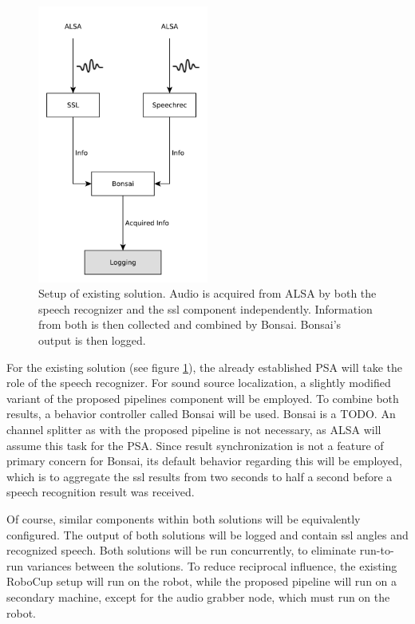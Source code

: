 \begin{figure}[]
	\centering
	\includegraphics[width=0.5\textwidth]{diagrams/eval_task_old.pdf}
	\caption{Setup of existing solution. 
		Audio is acquired from ALSA by both the speech recognizer and the \gls{ssl} component independently. 
		Information from both is then collected and combined by Bonsai.
		Bonsai's output is then logged.}
	\label{pic:eval_task_setup_old}
\end{figure}

For the existing solution (see figure \ref{pic:eval_task_setup_old}), the already established PSA will take the role of the speech recognizer.
For sound source localization, a slightly modified variant of the proposed pipelines component will be employed.
To combine both results, a behavior controller called Bonsai \cite{bonsai} will be used.
Bonsai is a TODO.
An channel splitter as with the proposed pipeline is not necessary, as ALSA will assume this task for the PSA.
Since result synchronization is not a feature of primary concern for Bonsai, its default behavior regarding this will be employed, which is to aggregate the \gls{ssl} results from two seconds to half a second before a speech recognition result was received.

Of course, similar components within both solutions will be equivalently configured.
The output of both solutions will be logged and contain \gls{ssl} angles and recognized speech.
Both solutions will be run concurrently, to eliminate run-to-run variances between the solutions.
To reduce reciprocal influence, the existing RoboCup setup will run on the robot, while the proposed pipeline will run on a secondary machine, except for the audio grabber node, which must run on the robot.

